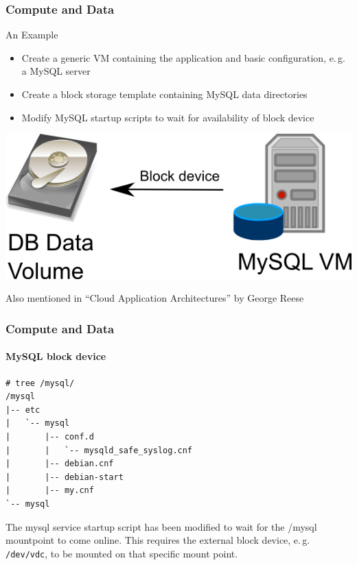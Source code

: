 \begin{frame}
\frametitle{Compute and Data}
An Example
\begin{itemize}
\item Create a generic VM containing the application and basic
  configuration, e.\,g. a MySQL server
\item Create a block storage template containing MySQL data directories
\item Modify MySQL startup scripts to wait for availability of block device
\end{itemize}
\begin{center}
\includegraphics[width=.4\textwidth]{images/DBaaS.png}
\end{center}
\hfill\tiny Also mentioned in ``Cloud Application Architectures'' by George Reese
\end{frame}

\begin{frame}[fragile]
\frametitle{Compute and Data}
\framesubtitle{MySQL block device}
\begin{lstlisting}
# tree /mysql/
/mysql
|-- etc
|   `-- mysql
|       |-- conf.d
|       |   `-- mysqld_safe_syslog.cnf
|       |-- debian.cnf
|       |-- debian-start
|       |-- my.cnf
`-- mysql
\end{lstlisting}
The mysql service startup script has been modified to wait for the
/mysql mountpoint to come online. This requires the external block
device, e.\,g. \texttt{/dev/vdc}, to be mounted on that specific mount
point.
\end{frame}

